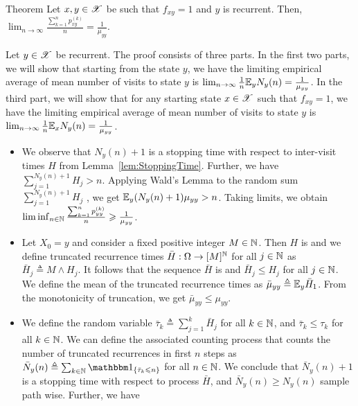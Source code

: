 \documentclass[12pt,aspectratio=169]{beamer}
\begin{document}
\begin{frame}
\begin{block}{Theorem} 
Let $x, y \in \mathscr{X}$ be such that $f_{xy} = 1$ and $y$ is recurrent.  
Then, $\lim_{n \to \infty}\frac{\sum_{k=1}^np_{xy}^{(k)}}{n} = \frac{1}{\mu_{yy}}$. 
\end{block}
\end{frame}
\begin{frame}
\begin{Proof} 
Let $y \in \mathscr{X}$ be recurrent. 
The proof consists of three parts. 
In the first two parts, we will show that starting from the state $y$, we have the limiting empirical average of mean number of visits to state $y$ is $\lim_{n \to \infty}\frac{1}{n}\mathbb{E}_yN_y(n) = \frac{1}{\mu_{yy}}$. 
In the third part, we will show that for any starting state $x \in \mathscr{X}$ such that $f_{xy}=1$, we have  the limiting empirical average of mean number of visits to state $y$ is $\lim_{n \to \infty}\frac{1}{n}\mathbb{E}_xN_y(n) = \frac{1}{\mu_{yy}}$. 
\begin{itemize}
\item[Lower bound:]<2->
We observe that $N_y(n)+1$ is a stopping time with respect to inter-visit times $H$ from Lemma~\ref{lem:StoppingTime}. 
Further, we have $\sum_{j=1}^{N_y(n)+1}H_j > n$. 
Applying Wald's Lemma to the random sum $\sum_{j=1}^{N_y(n)+1}H_j$ , we get $\mathbb{E}_y(N_y(n)+1)\mu_{yy} > n$. 
Taking limits, we obtain $\lim\inf_{n \in \mathbb{N}}\frac{\sum_{k=1}^np_{yy}^{(k)}}{n} \geqslant \frac{1}{\mu_{yy}}$. 
\end{itemize}
\end{Proof}
\end{frame}

\begin{frame}
\begin{Proof}
\begin{itemize}
\item[Upper bound:] Let $X_0 = y$ and consider a fixed positive integer $M\in \mathbb{N}$. 
Then $H$ is \iid and we define truncated recurrence times $\bar{H}:\Omega\to[M]^{\mathbb{N}}$ for all $j \in \mathbb{N}$ as  $\bar{H}_j \triangleq M \wedge H_j$. 
It follows that the sequence $\bar{H}$ is \iid and $\bar{H}_j \le H_j$ for all $j \in \mathbb{N}$. 
We define the mean of the truncated recurrence times as $\bar{\mu}_{yy} \triangleq \mathbb{E}_y\bar{H}_1$. 
From the monotonicity of truncation, we get $\bar{\mu}_{yy} \le \mu_{yy}$.

\item <2-> We define the random variable $\bar{\tau}_k \triangleq \sum_{j=1}^k\bar{H}_j$ for all $k \in \mathbb{N}$, 
and $\bar{\tau}_k \le \tau_k$ for all $k \in \mathbb{N}$. 
We can define the associated counting process that counts the number of truncated recurrences in first $n$ steps as 
$\bar{N}_y(n) \triangleq \sum_{k\in \N}\SetIn{\bar{\tau}_k \le n}$ for all $n \in \mathbb{N}$. 
We conclude that $\bar{N}_y(n)+1$ is a stopping time with respect to \iid process $\bar{H}$, 
and $\bar{N}_y(n) \ge N_y(n)$ sample path wise. 
Further, we have 
\end{itemize}
\end{Proof}
\end{frame}
\end{document}
